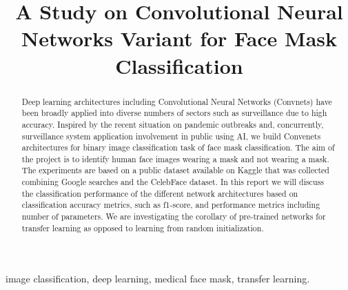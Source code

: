 \documentclass[conference]{IEEEtran}
\begin{document}
\title{\textbf{\LARGE A Study on Convolutional Neural Networks Variant for Face Mask Classification}}
\author{
}

\maketitle



\begin{abstract}
Deep learning architectures including Convolutional Neural Networks (Convnets) have been broadly applied into diverse numbers of sectors such as surveillance due to high accuracy. Inspired by the recent situation on pandemic outbreaks and, concurrently, surveillance system application involvement in public using AI, we build Convenets architectures for binary image classification task of face mask classification. The aim of the project is to identify human face images wearing a mask and not wearing a mask. The experiments are based on a public dataset available on Kaggle that was collected combining Google searches and the CelebFace\cite{liu2015faceattributes} dataset. In this report we will discuss the classification performance of the different network architectures based on classification accuracy metrics, such as f1-score, and performance metrics including number of parameters. We are investigating the corollary of pre-trained networks for transfer learning as opposed to learning  from random initialization. 
\end{abstract}

\begin{keywords}
image classification, deep learning, medical face mask, transfer learning.
\end{keywords}
\end{document}
